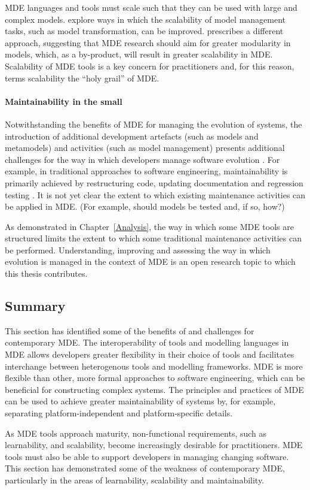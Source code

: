 MDE languages and tools must scale such that they can be used with large and complex models. \cite{hearnden06incremental,rath08live,tratt08change} explore ways in which the scalability of model management tasks, such as model transformation, can be improved. \cite{kolovos08scalability} prescribes a different approach, suggesting that MDE research should aim for greater modularity in models, which, as a by-product, will result in greater scalability in MDE. Scalability of MDE tools is a key concern for practitioners and, for this reason, \cite{kolovos08scalability} terms scalability the ``holy grail'' of MDE.

\paragraph{Maintainability in the small} Notwithstanding the benefits of MDE for managing the evolution of systems, the introduction of additional development artefacts (such as models and metamodels) and activities (such as model management) presents additional challenges for the way in which developers manage software evolution \cite{Mens07}. For example, in traditional approaches to software engineering, maintainability is primarily achieved by restructuring code, updating documentation and regression testing \cite{feathers04working}. It is not yet clear the extent to which existing maintenance activities can be applied in MDE. (For example, should models be tested and, if so, how?)

As demonstrated in Chapter~\ref{Analysis}, the way in which some MDE tools are structured limits the extent to which some traditional maintenance activities can be performed. Understanding, improving and assessing the way in which evolution is managed in the context of MDE is an open research topic to which this thesis contributes. 

\subsection{Summary}
This section has identified some of the benefits of and challenges for contemporary MDE. The interoperability of tools and modelling languages in MDE allows developers greater flexibility in their choice of tools and facilitates interchange between heterogenous tools and modelling frameworks. MDE is more flexible than other, more formal approaches to software engineering, which can be beneficial for constructing complex systems. The principles and practices of MDE can be used to achieve greater maintainability of systems by, for example, separating platform-independent and platform-specific details.

As MDE tools approach maturity, non-functional requirements, such as learnability, and scalability, become increasingly desirable for practitioners. MDE tools must also be able to support developers in managing changing software. This section has demonstrated some of the weakness of contemporary MDE, particularly in the areas of learnability, scalability and maintainability.